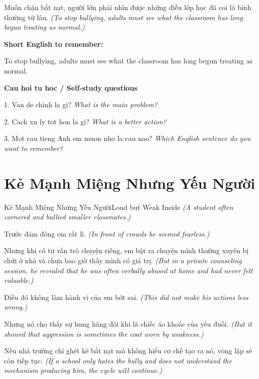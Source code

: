\begin{baihoc}
Muốn chặn bắt nạt, người lớn phải nhìn được những điều lớp học đã coi là bình thường từ lâu.
\textit{(To stop bullying, adults must see what the classroom has long begun treating as normal.)}
\end{baihoc}

\begin{ghinhoanh}
\textbf{Short English to remember:}

To stop bullying, adults must see what the classroom has long begun treating as normal.

\end{ghinhoanh}

\begin{tuhocnhanh}
\textbf{Cau hoi tu hoc / Self-study questions}

1. Van de chinh la gi? \textit{What is the main problem?}

2. Cach xu ly tot hon la gi? \textit{What is a better action?}

3. Mot cau tieng Anh em muon nho la cau nao? \textit{Which English sentence do you want to remember?}
\end{tuhocnhanh}
\ngancach

\section{Kẻ Mạnh Miệng Nhưng Yếu Người}
\begin{truyen}{Kẻ Mạnh Miệng Nhưng Yếu Người}{Loud but Weak Inside}
\textit{(A student often cornered and bullied smaller classmates.)}

Trước đám đông em rất lì.
\textit{(In front of crowds he seemed fearless.)}

Nhưng khi cô tư vấn trò chuyện riêng, em bật ra chuyện mình thường xuyên bị chửi ở nhà và chưa bao giờ thấy mình có giá trị.
\textit{(But in a private counseling session, he revealed that he was often verbally abused at home and had never felt valuable.)}

Điều đó không làm hành vi của em bớt sai.
\textit{(This did not make his actions less wrong.)}

Nhưng nó cho thấy sự hung hăng đôi khi là chiếc áo khoác của yếu đuối.
\textit{(But it showed that aggression is sometimes the coat worn by weakness.)}

Nếu nhà trường chỉ ghét kẻ bắt nạt mà không hiểu cơ chế tạo ra nó, vòng lặp sẽ còn tiếp tục.
\textit{(If a school only hates the bully and does not understand the mechanism producing him, the cycle will continue.)}

\end{truyen}

